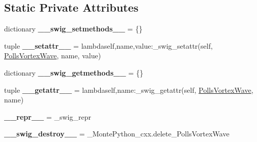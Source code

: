 \subsection*{Static Private Attributes}
\begin{DoxyCompactItemize}
\item 
\hypertarget{classMontePython__cxx_1_1PollsVortexWave_a9431344fd1817b4f849aa402994e1e08}{}dictionary {\bfseries \+\_\+\+\_\+swig\+\_\+setmethods\+\_\+\+\_\+} = \{\}\label{classMontePython__cxx_1_1PollsVortexWave_a9431344fd1817b4f849aa402994e1e08}

\item 
\hypertarget{classMontePython__cxx_1_1PollsVortexWave_a4cb43c731f4145e22e43ed59ba488f18}{}tuple {\bfseries \+\_\+\+\_\+setattr\+\_\+\+\_\+} = lambdaself,name,value\+:\+\_\+swig\+\_\+setattr(self, \hyperlink{classMontePython__cxx_1_1PollsVortexWave}{Polls\+Vortex\+Wave}, name, value)\label{classMontePython__cxx_1_1PollsVortexWave_a4cb43c731f4145e22e43ed59ba488f18}

\item 
\hypertarget{classMontePython__cxx_1_1PollsVortexWave_adf968936e573738fc22705cc9e4176f6}{}dictionary {\bfseries \+\_\+\+\_\+swig\+\_\+getmethods\+\_\+\+\_\+} = \{\}\label{classMontePython__cxx_1_1PollsVortexWave_adf968936e573738fc22705cc9e4176f6}

\item 
\hypertarget{classMontePython__cxx_1_1PollsVortexWave_ae7affc9a21c82931e08a6037d7d8f1f2}{}tuple {\bfseries \+\_\+\+\_\+getattr\+\_\+\+\_\+} = lambdaself,name\+:\+\_\+swig\+\_\+getattr(self, \hyperlink{classMontePython__cxx_1_1PollsVortexWave}{Polls\+Vortex\+Wave}, name)\label{classMontePython__cxx_1_1PollsVortexWave_ae7affc9a21c82931e08a6037d7d8f1f2}

\item 
\hypertarget{classMontePython__cxx_1_1PollsVortexWave_a2d6f1bf9acaa39b67a269b4d0f67025e}{}{\bfseries \+\_\+\+\_\+repr\+\_\+\+\_\+} = \+\_\+swig\+\_\+repr\label{classMontePython__cxx_1_1PollsVortexWave_a2d6f1bf9acaa39b67a269b4d0f67025e}

\item 
\hypertarget{classMontePython__cxx_1_1PollsVortexWave_a7e0a0713408e5c4a76be24e367ad378f}{}{\bfseries \+\_\+\+\_\+swig\+\_\+destroy\+\_\+\+\_\+} = \+\_\+\+Monte\+Python\+\_\+cxx.\+delete\+\_\+\+Polls\+Vortex\+Wave\label{classMontePython__cxx_1_1PollsVortexWave_a7e0a0713408e5c4a76be24e367ad378f}

\end{DoxyCompactItemize}


